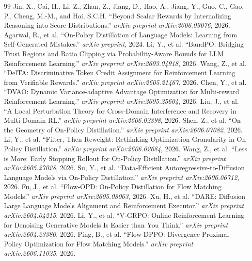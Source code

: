 \documentclass[11pt,a4paper]{article}
\begin{document}
\begin{thebibliography}{99}
 Jin, X., Cai, H., Li, Z., Zhan, Z., Jiang, D., Hao, A., Jiang, Y., Guo, C., Gao, P., Cheng, M.-M., and Hoi, S.C.H. ``Beyond Scalar Rewards by Internalizing Reasoning into Score Distributions.'' \emph{arXiv preprint arXiv:2606.09076}, 2026.
 Agarwal, R., et al. ``On-Policy Distillation of Language Models: Learning from Self-Generated Mistakes.'' \emph{arXiv preprint}, 2024.
 Li, Y., et al. ``BandPO: Bridging Trust Regions and Ratio Clipping via Probability-Aware Bounds for LLM Reinforcement Learning.'' \emph{arXiv preprint arXiv:2603.04918}, 2026.
 Wang, Z., et al. ``DelTA: Discriminative Token Credit Assignment for Reinforcement Learning from Verifiable Rewards.'' \emph{arXiv preprint arXiv:2605.21467}, 2026.
 Chen, Y., et al. ``DVAO: Dynamic Variance-adaptive Advantage Optimization for Multi-reward Reinforcement Learning.'' \emph{arXiv preprint arXiv:2605.25604}, 2026.
 Liu, J., et al. ``A Local Perturbation Theory for Cross-Domain Interference and Recovery in Multi-Domain RL.'' \emph{arXiv preprint arXiv:2606.02398}, 2026.
 Shen, Z., et al. ``On the Geometry of On-Policy Distillation.'' \emph{arXiv preprint arXiv:2606.07082}, 2026.
 Li, Y., et al. ``Filter, Then Reweight: Rethinking Optimization Granularity in On-Policy Distillation.'' \emph{arXiv preprint arXiv:2606.02684}, 2026.
 Wang, Z., et al. ``Less is More: Early Stopping Rollout for On-Policy Distillation.'' \emph{arXiv preprint arXiv:2605.27028}, 2026.
 Su, Y., et al. ``Data-Efficient Autoregressive-to-Diffusion Language Models via On-Policy Distillation.'' \emph{arXiv preprint arXiv:2606.06712}, 2026.
 Fu, J., et al. ``Flow-OPD: On-Policy Distillation for Flow Matching Models.'' \emph{arXiv preprint arXiv:2605.08063}, 2026.
 Xu, H., et al. ``DARE: Diffusion Large Language Models Alignment and Reinforcement Executor.'' \emph{arXiv preprint arXiv:2604.04215}, 2026.
 Li, Y., et al. ``V-GRPO: Online Reinforcement Learning for Denoising Generative Models Is Easier than You Think.'' \emph{arXiv preprint arXiv:2604.23380}, 2026.
 Ping, B., et al. ``Flow-DPPO: Divergence Proximal Policy Optimization for Flow Matching Models.'' \emph{arXiv preprint arXiv:2606.11025}, 2026.
\end{thebibliography}
\end{document}
